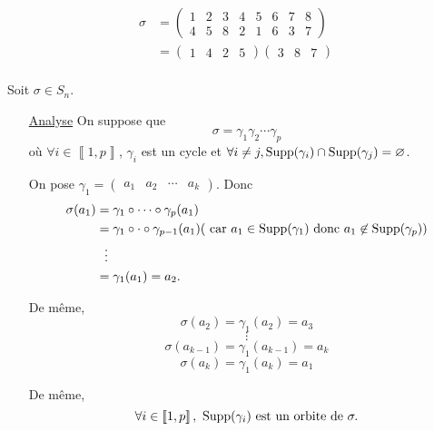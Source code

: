 \begin{exm}
	\begin{align*}
		\sigma &= \begin{pmatrix}
			1&2&3&4&5&6&7&8\\
			4&5&8&2&1&6&3&7
		\end{pmatrix}\\
		&= \begin{pmatrix}
			1&4&2&5
		\end{pmatrix} \begin{pmatrix}
			3&8&7
		\end{pmatrix}\\
	\end{align*}
\end{exm}

\begin{prv}
	Soit $\sigma \in S_n$.

	\begin{itemize}
		\item[\underline{\sc Analyse}] On suppose que \[
				\sigma = \gamma_1 \gamma_2 \cdots \gamma_p
			\] où $\forall i \in \left\llbracket 1,p \right\rrbracket$, $\gamma_i$ est un cycle et $\forall i \neq j, \operatorname{Supp}(\gamma_i)\cap \operatorname{Supp}(\gamma_j) = \varnothing$.

			On pose $\gamma_1 = \begin{pmatrix}
				a_1&a_2&\cdots&a_k
			\end{pmatrix}$. Donc
			\begin{align*}
				\sigma(a_1) &= \gamma_1 \circ \cdots \circ \gamma_p(a_1)\\
				&= \gamma_1  \circ \cdot  \circ \gamma_{p-1}(a_1) (\text{ car } a_1 \in \operatorname{Supp}(\gamma_1) \text{ donc } a_1\not\in \operatorname{Supp}(\gamma_p))\\
				&~~\vdots \\
				&= \gamma_1(a_1) = a_2. \\
			\end{align*}

			De même,
			\[ \sigma(a_2) = \gamma_1(a_2) = a_3 \]
			\[\vdots\]
			\[ \sigma(a_{k-1}) = \gamma_1(a_{k-1}) = a_k \]
			\[ \sigma(a_k) = \gamma_1(a_k) = a_1 \]

			De même, \[
				\forall i \in \left\llbracket 1,p \right\rrbracket,~\operatorname{Supp}(\gamma_i) \text{ est un orbite de } \sigma.
			\]


\end{itemize}
\end{prv}
